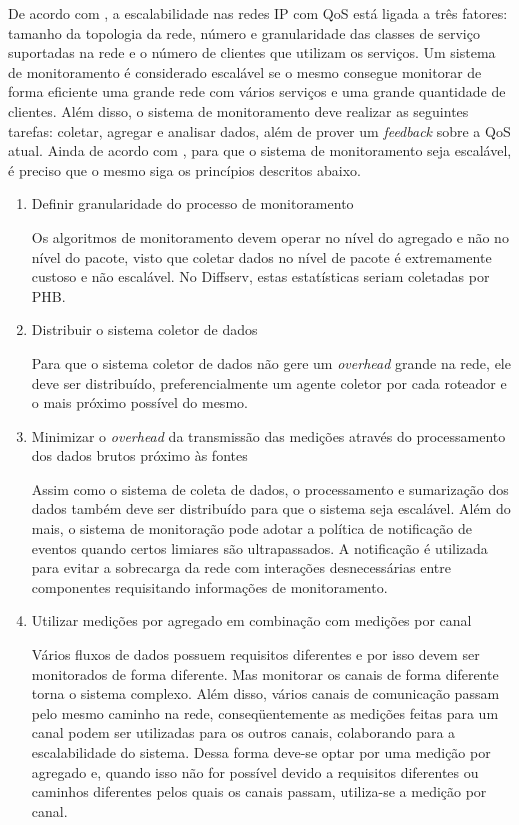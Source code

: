 	De acordo com \cite{ATIPPEB02}, a escalabilidade nas redes IP com QoS está ligada a três fatores: tamanho da topologia da rede, número e granularidade das classes de serviço suportadas na rede e o número de clientes que utilizam os serviços. Um sistema de monitoramento é considerado escalável se o mesmo consegue monitorar de forma eficiente uma grande rede com vários serviços e uma grande quantidade de clientes. Além disso, o sistema de monitoramento deve realizar as seguintes tarefas: coletar, agregar e analisar dados, além de prover um \textit{feedback} sobre a QoS atual. Ainda de acordo com \cite{ATIPPEB02}, para que o sistema de monitoramento seja escalável, é preciso que o mesmo siga os  princípios descritos abaixo.

\begin{enumerate}

\item Definir granularidade do processo de monitoramento
	
	Os algoritmos de monitoramento devem operar no nível do agregado e não no nível do pacote, visto que coletar dados no nível de pacote é  extremamente custoso e não escalável. No Diffserv, estas estatísticas seriam coletadas por PHB.
	
\item Distribuir o sistema coletor de dados
	
	Para que o sistema coletor de dados não gere um \textit{overhead} grande na rede, ele deve ser distribuído, preferencialmente um agente coletor por cada roteador e o mais próximo possível do mesmo.
	
\item Minimizar o \textit{overhead} da transmissão das medições através do processamento dos dados brutos próximo às fontes

	Assim como o sistema de coleta de dados, o processamento e sumarização dos dados também deve ser distribuído para que o sistema seja escalável. Além do mais, o sistema de monitoração pode adotar a política de notificação de eventos quando certos limiares são ultrapassados. A notificação é utilizada para evitar a sobrecarga da rede com interações desnecessárias entre componentes requisitando informações de monitoramento.
	
\item Utilizar medições por agregado em combinação com medições por canal

	Vários fluxos de dados possuem requisitos diferentes e por isso devem ser monitorados de forma diferente. Mas monitorar os canais de forma diferente torna o sistema complexo. Além disso, vários canais de comunicação passam pelo mesmo caminho na rede, conseqüentemente as medições feitas para um canal podem ser utilizadas para os outros canais, colaborando para a escalabilidade do sistema. Dessa forma deve-se optar por uma medição por agregado e, quando isso não for possível devido a requisitos diferentes ou caminhos diferentes pelos quais os canais passam, utiliza-se a medição por canal.

\end{enumerate}	

